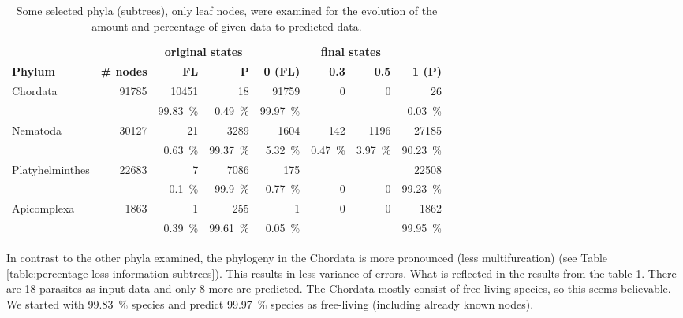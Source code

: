       \begin{table}
        \begin{center}
          \begin{tabular}{ |l|r||r|r||r|r|r|r| }
            \hline
            & & \multicolumn{2}{c||}{\bfseries original states} & \multicolumn{4}{c|}{\bfseries final states} \\
            \bfseries Phylum & \bfseries \# nodes & \bfseries FL & \bfseries P & \bfseries 0 \bfseries (FL) & \bfseries 0.3 &\bfseries  0.5 & \bfseries 1 (P) \\
            \hline \hline
            Chordata & 91785        & 10451 & 18          & 91759 & 0 & 0 & 26 \\
            &                       & 99.83~\% & 0.49~\%  & 99.97~\% & & & 0.03~\% \\ \hline
            Nematoda & 30127        & 21 & 3289           & 1604 & 142 & 1196 & 27185 \\
            &                       & 0.63~\% & 99.37~\%  & 5.32~\% & 0.47~\% & 3.97~\% & 90.23~\% \\ \hline
            Platyhelminthes & 22683 & 7 & 7086            & 175 & & & 22508 \\
            &                       & 0.1~\% & 99.9~\%    & 0.77~\% & 0 & 0 & 99.23~\% \\ \hline
            Apicomplexa & 1863      & 1 & 255             & 1 & 0 & 0 & 1862 \\
            &                       & 0.39~\% & 99.61~\%  & 0.05~\% & & & 99.95~\% \\
            \hline
          \end{tabular} 
        \end{center}
        \caption{Some selected phyla (subtrees), only leaf nodes, were examined for the evolution 
          of the amount and percentage of given data to predicted data.}
        \label{table:phylum leaf nodes states} 
      \end{table}

      In contrast to the other phyla examined, the phylogeny in the Chordata is more pronounced (less 
        multifurcation) (see Table \ref{table:percentage loss information subtrees}). This results in 
        less variance of errors. What is reflected in the results from the table 
        \ref{table:phylum leaf nodes states}. There are 18 parasites as input data and only 8 more are 
        predicted. The Chordata mostly consist of free-living species, so this seems believable. We 
        started with 99.83~\%  species and predict 99.97~\% species as free-living (including already 
        known nodes).

